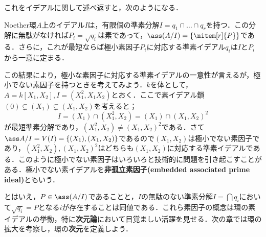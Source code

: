 これをイデアルに関して述べ返すと，次のようになる．
\begin{cor}\label{cor:イデアルの準素分解}
	Noether環$A$上のイデアル$I$は，有限個の準素分解$I= q_1\cap\dots\cap q_r$を持つ．この分解に無駄がなければ$P_i=\sqrt{q_i}$は素であって，$\ass (A/I)=\{\nitem[r]{P}\}$である．さらに，これが最短ならば極小素因子$P_i$に対応する準素イデアル$q_i$は$I$と$ P_i$から一意に定まる．
\end{cor}

この結果により，極小な素因子に対応する準素イデアルの一意性が言えるが，極小でない素因子を持つときを考えてみよう．$k$を体として，$A=k[X_1,X_2],I=(X_1^2,X_1X_2)$とおく．ここで素イデアル鎖$(0)\subsetneq (X_1)\subsetneq(X_1,X_2)$を考えると；
\[I=(X_1)\cap (X_1^2,X_2)=(X_1)\cap (X_1,X_2)^2\]
が最短準素分解であり，$(X_1^2,X_2)\neq(X_1,X_2)^2$である．さて$\ass A/I=V(I)=\{(X_1),(X_1,X_2)\}$であるので$(X_1,X_2)$は極小でない素因子であり，$(X_1^2,X_2),(X_1,X_2)^2$はどちらも$(X_1,X_2)$に対応する準素イデアルである．このように極小でない素因子はいろいろと技術的に問題を引き起こすことがある．極小でない素イデアルを\textbf{非孤立素因子(embedded associated prime ideal)}ともいう．

とはいえ，$P\in\ass (A/I)$であることと，$I$の無駄のない準素分解$I=\bigcap q_i$において$\sqrt{q_i}=P$となる$i$が存在することは同値である．これら素因子の概念は環の素イデアルの挙動，特に\textbf{次元論}において目覚ましい活躍を見せる．次の章では環の拡大を考察し，環の\textbf{次元}を定義しよう．